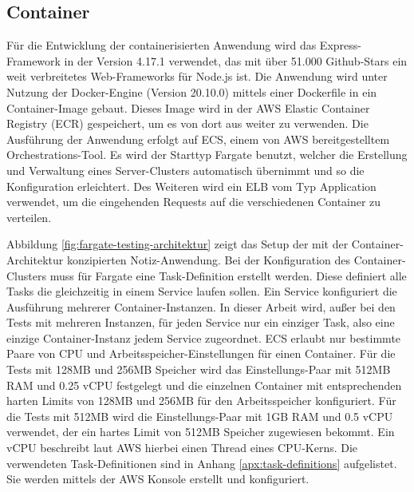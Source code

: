 \subsection{Container}
Für die Entwicklung der containerisierten Anwendung wird das Express-Framework in der Version 4.17.1 verwendet, das mit über 51.000 Github-Stars ein weit verbreitetes Web-Frameworks für Node.js ist\cite{noauthor_expressjsexpress_2021}. Die Anwendung wird unter Nutzung der Docker-Engine (Version 20.10.0) mittels einer Dockerfile in ein Container-Image gebaut. Dieses Image wird in der \ac{AWS} Elastic Container Registry (ECR) gespeichert, um es von dort aus weiter zu verwenden. 
Die Ausführung der Anwendung erfolgt auf \ac{ECS}, einem von \ac{AWS} bereitgestelltem Orchestrations-Tool. Es wird der Starttyp Fargate benutzt, welcher die Erstellung und Verwaltung eines Server-Clusters automatisch übernimmt und so die Konfiguration erleichtert. Des Weiteren wird ein \ac{ELB} vom Typ Application verwendet, um die eingehenden Requests auf die verschiedenen Container zu verteilen. 

Abbildung \ref{fig:fargate-testing-architektur} zeigt das Setup der mit der Container-Architektur konzipierten Notiz-Anwendung. Bei der Konfiguration des Container-Clusters muss für Fargate eine Task-Definition erstellt werden. Diese definiert alle Tasks die gleichzeitig in einem Service laufen sollen. Ein Service konfiguriert die Ausführung mehrerer Container-Instanzen. In dieser Arbeit wird, außer bei den Tests mit mehreren Instanzen, für jeden Service nur ein einziger Task, also eine einzige Container-Instanz jedem Service zugeordnet. \ac{ECS} erlaubt nur bestimmte Paare von CPU und Arbeitsspeicher-Einstellungen für einen Container. Für die Tests mit 128MB und 256MB Speicher wird das Einstellungs-Paar mit 512MB RAM und 0.25 vCPU festgelegt und die einzelnen Container mit entsprechenden harten Limits von 128MB und 256MB für den Arbeitsspeicher konfiguriert. Für die Tests mit 512MB wird die Einstellungs-Paar mit 1GB RAM und 0.5 vCPU verwendet, der ein hartes Limit von 512MB Speicher zugewiesen bekommt. Ein \ac{vCPU} beschreibt laut \ac{AWS} hierbei einen Thread eines CPU-Kerns\cite{noauthor_cpu-optionen_nodate}. Die verwendeten Task-Definitionen sind in Anhang \ref{apx:task-definitions} aufgelistet. Sie werden mittels der \ac{AWS} Konsole erstellt und konfiguriert.

